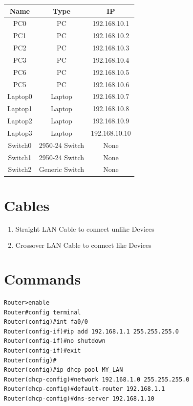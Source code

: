 \documentclass[11pt]{article}
\begin{document}
\begin{table}[H] 
	\centering
	\begin{tabular}{|c|c|c|}
	\hline
	\textbf{Name} & \textbf{Type}      & \textbf{IP}    \\ 
	\hline
	PC0           & PC                 & 192.168.10.1   \\ 
	\hline
	PC1           & PC                 & 192.168.10.2   \\ 
	\hline
	PC2           & PC                 & 192.168.10.3   \\ 
	\hline
	PC3           & PC                 & 192.168.10.4   \\ 
	\hline
	PC6           & PC                 & 192.168.10.5   \\ 
	\hline
	PC5           & PC                 & 192.168.10.6   \\ 
	\hline
	Laptop0       & Laptop             & 192.168.10.7   \\ 
	\hline
	Laptop1       & Laptop             & 192.168.10.8   \\ 
	\hline
	Laptop2       & Laptop             & 192.168.10.9   \\ 
	\hline
	Laptop3       & Laptop             & 192.168.10.10  \\ 
	\hline
	Switch0       & 2950-24
					Switch & None           \\ 
	\hline
	Switch1       & 2950-24
					Switch & None           \\ 
	\hline
	Switch2       & Generic
					Switch & None           \\
	\hline
	\end{tabular}
	\end{table}

\section{Cables}
\begin{enumerate}
	\item Straight LAN Cable to connect unlike Devices
	\item Crossover LAN Cable to connect like Devices
\end{enumerate}

\section{Commands}
\begin{verbatim}
Router>enable
Router#config terminal
Router(config)#int fa0/0
Router(config-if)#ip add 192.168.1.1 255.255.255.0
Router(config-if)#no shutdown
Router(config-if)#exit
Router(config)#
Router(config)#ip dhcp pool MY_LAN
Router(dhcp-config)#network 192.168.1.0 255.255.255.0
Router(dhcp-config)#default-router 192.168.1.1
Router(dhcp-config)#dns-server 192.168.1.10
\end{verbatim}
\end{document}
